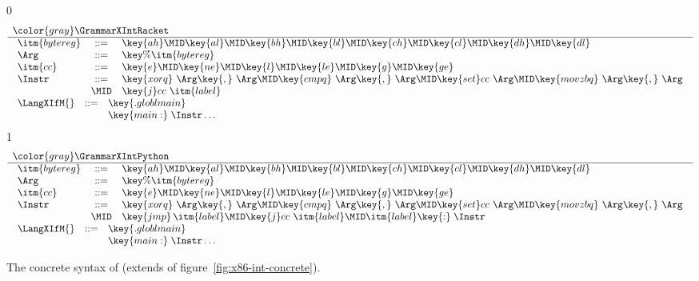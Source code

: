 \documentclass[7x10]{TimesAPriori_MIT}%
\newcommand{\gray}[1]{{\color{gray} #1}}
\def\racketEd{0}
\def\pythonEd{1}
\def\edition{1}
\numberwithin{theorem}{chapter}
\numberwithin{definition}{chapter}
\numberwithin{equation}{chapter}
\begin{document}
\newcommand{\GrammarXIfRacket}{
\begin{array}{lcl}
  \itm{bytereg} &::=& \key{ah} \MID \key{al} \MID \key{bh} \MID \key{bl}
    \MID \key{ch} \MID \key{cl} \MID \key{dh} \MID \key{dl} \\
\Arg &::=& \key{\%}\itm{bytereg}\\
\itm{cc} & ::= & \key{e} \MID \key{ne} \MID \key{l} \MID \key{le} \MID \key{g} \MID \key{ge} \\
\Instr &::=& \key{xorq}~\Arg\key{,}~\Arg
   \MID \key{cmpq}~\Arg\key{,}~\Arg
    \MID  \key{set}cc~\Arg 
    \MID \key{movzbq}~\Arg\key{,}~\Arg \\
    &\MID& \key{j}cc~\itm{label} \\
\end{array}
}

\newcommand{\GrammarXIfPython}{
\begin{array}{lcl}
  \itm{bytereg} &::=& \key{ah} \MID \key{al} \MID \key{bh} \MID \key{bl}
    \MID \key{ch} \MID \key{cl} \MID \key{dh} \MID \key{dl} \\
\Arg &::=& \key{\%}\itm{bytereg}\\
\itm{cc} & ::= & \key{e} \MID \key{ne} \MID \key{l} \MID \key{le} \MID \key{g} \MID \key{ge} \\
\Instr &::=& \key{xorq}~\Arg\key{,}~\Arg
   \MID \key{cmpq}~\Arg\key{,}~\Arg
    \MID  \key{set}cc~\Arg 
    \MID \key{movzbq}~\Arg\key{,}~\Arg \\
    &\MID& \key{jmp}\,\itm{label} \MID \key{j}cc~\itm{label} 
           \MID \itm{label}\key{:}\; \Instr 
\end{array}
}


\begin{figure}[tp]
  \begin{tcolorbox}[colback=white]
{\if\edition\racketEd    
\[
\begin{array}{l}
  \gray{\GrammarXIntRacket} \\ \hline
  \GrammarXIfRacket \\ 
\begin{array}{lcl}
\LangXIfM{} &::= &  \key{.globl main} \\
      &    & \key{main:} \; \Instr\ldots 
\end{array}
\end{array}
\]
\fi}
{\if\edition\pythonEd    
\[
\begin{array}{l}
  \gray{\GrammarXIntPython} \\ \hline
  \GrammarXIfPython \\ 
\begin{array}{lcl}
\LangXIfM{} &::= &  \key{.globl main} \\
      &    & \key{main:} \; \Instr\ldots 
\end{array}
\end{array}
\]
\fi}
\end{tcolorbox}
\caption{The concrete syntax of \LangXIf{}  (extends \LangXInt{} of figure~\ref{fig:x86-int-concrete}).}
\label{fig:x86-1-concrete}
\end{figure}
\end{document}
